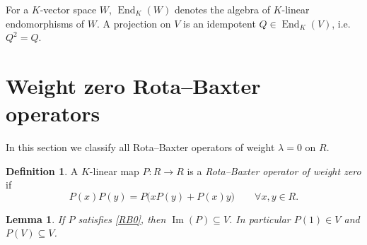 \documentclass[a4paper,11pt]{elsarticle}
\newtheorem{lemma}[theorem]{Lemma}
\theoremstyle{definition}
\newtheorem{definition}[theorem]{Definition}
\theoremstyle{remark}
\DeclareMathOperator{\End}{End}
\DeclareMathOperator{\im}{Im}
\begin{document}
For a $K$-vector space $W$, $\End_K(W)$ denotes the algebra of $K$-linear endomorphisms of $W$.
A projection on $V$ is an idempotent $Q \in \End_K(V)$, i.e. $Q^2 = Q$.

\section{Weight zero Rota--Baxter operators}\label{sec:wt0}

In this section we classify all Rota--Baxter operators of weight $\lambda = 0$ on $R$.

\begin{definition}
A $K$-linear map $P : R \to R$ is a \emph{Rota--Baxter operator of weight zero} if
\begin{equation}\label{RB0}
P(x)P(y) = P\bigl(x P(y) + P(x) y\bigr) \qquad \forall x,y \in R.
\end{equation}
\end{definition}

\begin{lemma}\label{lem:im_in_V}
If $P$ satisfies \eqref{RB0}, then $\im(P) \subseteq V$.  In particular $P(1) \in V$ and $P(V) \subseteq V$.
\end{lemma}
\end{document}
